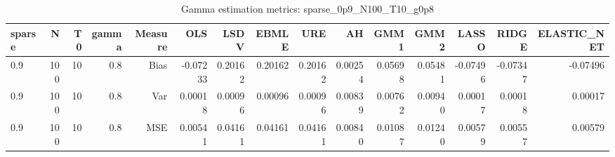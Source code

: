 \begin{table}[!htbp]\centering
\caption{Gamma estimation metrics: sparse_0p9_N100_T10_g0p8}
\label{tab:table1_sparse_0p9_N100_T10_g0p8}
\begin{tabular}{lrrrrrrrrrrrrrr}
\hline
sparse & N & T0 & gamma & Measure & OLS & LSDV & EBMLE & URE & AH & GMM1 & GMM2 & LASSO & RIDGE & ELASTIC_NET \\
\hline
0.9 & 100 & 10 & 0.8 & Bias & -0.07233 & 0.20162 & 0.20162 & 0.20162 & 0.00254 & 0.05698 & 0.05481 & -0.07496 & -0.07347 & -0.07496 \\
0.9 & 100 & 10 & 0.8 & Var & 0.00018 & 0.00096 & 0.00096 & 0.00096 & 0.00839 & 0.00762 & 0.00940 & 0.00017 & 0.00018 & 0.00017 \\
0.9 & 100 & 10 & 0.8 & MSE & 0.00541 & 0.04161 & 0.04161 & 0.04161 & 0.00840 & 0.01087 & 0.01240 & 0.00579 & 0.00557 & 0.00579 \\
\hline
\end{tabular}
\end{table}


